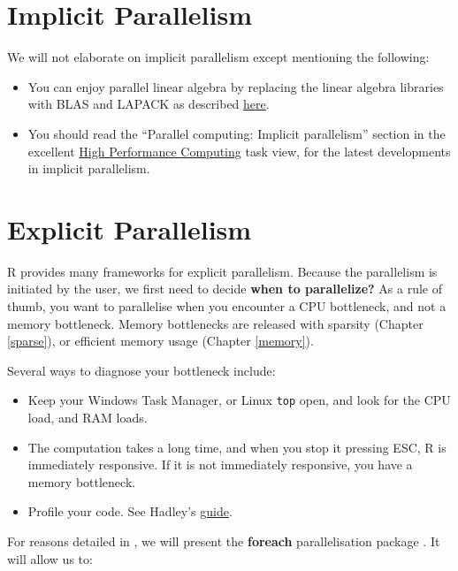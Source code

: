 \documentclass[]{book}
\providecommand{\tightlist}{%
  \setlength{\itemsep}{0pt}\setlength{\parskip}{0pt}}
\theoremstyle{definition}
\theoremstyle{definition}
\theoremstyle{definition}
\theoremstyle{remark}
\begin{document}
\section{Implicit Parallelism}\label{implicit-parallelism}

We will not elaborate on implicit parallelism except mentioning the
following:

\begin{itemize}
\tightlist
\item
  You can enjoy parallel linear algebra by replacing the linear algebra
  libraries with BLAS and LAPACK as described
  \href{https://www.r-bloggers.com/faster-r-through-better-blas/}{here}.
\item
  You should read the ``Parallel computing: Implicit parallelism''
  section in the excellent
  \href{https://cran.r-project.org/web/views/HighPerformanceComputing.html}{High
  Performance Computing} task view, for the latest developments in
  implicit parallelism.
\end{itemize}

\section{Explicit Parallelism}\label{explicit-parallelism}

R provides many frameworks for explicit parallelism. Because the
parallelism is initiated by the user, we first need to decide
\textbf{when to parallelize?} As a rule of thumb, you want to
parallelise when you encounter a CPU bottleneck, and not a memory
bottleneck. Memory bottlenecks are released with sparsity (Chapter
\ref{sparse}), or efficient memory usage (Chapter \ref{memory}).

Several ways to diagnose your bottleneck include:

\begin{itemize}
\tightlist
\item
  Keep your Windows Task Manager, or Linux \texttt{top} open, and look
  for the CPU load, and RAM loads.
\item
  The computation takes a long time, and when you stop it pressing ESC,
  R is immediately responsive. If it is not immediately responsive, you
  have a memory bottleneck.
\item
  Profile your code. See Hadley's
  \href{http://adv-r.had.co.nz/Profiling.html}{guide}.
\end{itemize}

For reasons detailed in \citet{kane2013scalable}, we will present the
\textbf{foreach} parallelisation package \citep{foreach}. It will allow
us to:
\end{document}
